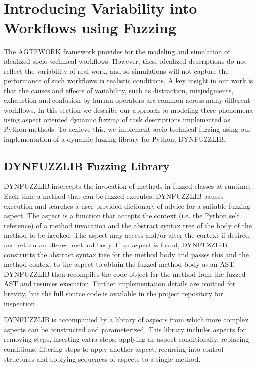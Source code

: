 \documentclass{llncs}
\begin{document}
\section{Introducing Variability into Workflows using Fuzzing}

The AGTFWORK framework provides for the modeling and simulation of idealized socio-technical workflows.  However, these
idealized descriptions do not reflect the variability of real work, and so simulations will not capture the performance
of such workflows in realistic conditions.  A key insight in our work is that the causes and effects of variability,
such as distraction, misjudgments, exhaustion and confusion by human operators are common across many different
workflows.  In this section we describe our approach to modeling these phenomena using aspect oriented dynamic fuzzing
of task descriptions implemented as Python methods.  To achieve this, we implement socio-technical fuzzing using our
implementation of a dynamic fuzzing library for Python, DYNFUZZLIB.

\subsection{DYNFUZZLIB Fuzzing Library}

DYNFUZZLIB intercepts the invocation of methods in fuzzed classes at runtime.  Each time a method that can be fuzzed
executes, DYNFUZZLIB pauses execution and searches a user provided dictionary of advice for a suitable fuzzing
aspect. The aspect is a function that accepts the context (i.e. the Python self reference) of a method invocation and
the abstract syntax tree of the body of the method to be invoked.  The aspect may access and/or alter the context if
desired and return an altered method body.  If an aspect is found, DYNFUZZLIB constructs the abstract syntax tree for
the method body and passes this and the method context to the aspect to obtain the fuzzed method body as an AST.
DYNFUZZLIB then recompiles the code object for the method from the fuzzed AST and resumes execution.  Further
implementation details are omitted for brevity, but the full source code is available in the project repository for
inspection \cite{ANON}.

DYNFUZZLIB is accompanied by a library of aspects from which more complex aspects can be constructed and parameterized.
This library includes aspects for removing steps, inserting extra steps, applying an aspect conditionally, replacing
conditions, filtering steps to apply another aspect, recursing into control structures and applying sequences of aspects
to a single method.
\end{document}
